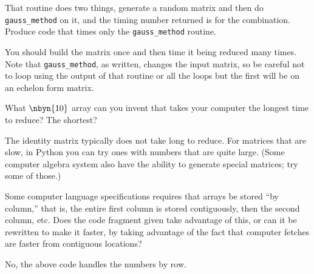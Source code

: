 \begin{exercises}
    That routine does two things, generate a random matrix and 
    then do \lstinline[style=inline]!gauss_method! on it, and the 
    timing number returned is for the combination.
    Produce code that times only the 
    \lstinline[style=inline]!gauss_method! routine. 
    \begin{answer}
      You should build the matrix once and then time it being reduced
      many times.
      Note that \lstinline[style=inline]!gauss_method!, as written,
      changes the input matrix, so be careful not to loop using 
      the output of that routine or all the loops but the first will 
      be on an echelon form matrix.
    \end{answer}
  \item 
    What $\nbyn{10}$ array can you invent that takes your computer
    the longest time to reduce?
    The shortest?
    \begin{answer}
      The identity matrix typically does not take long to reduce.
      For matrices that are slow, in Python you can try ones with numbers that
      are quite large.
      (Some computer algebra system also have the ability to generate
      special matrices; try some of those.)
    \end{answer}
  \item Some computer language specifications requires that arrays be
    stored ``by column,'' that is, the entire first column is stored
    contiguously, then the second column, etc.
    Does the code fragment given take advantage of this,
    or can it be rewritten to make it faster, by taking advantage of
    the fact that computer fetches are faster from contiguous locations?
    \begin{answer}
      No, the above code handles the numbers by row.
    \end{answer}
\end{exercises}
\endinput
